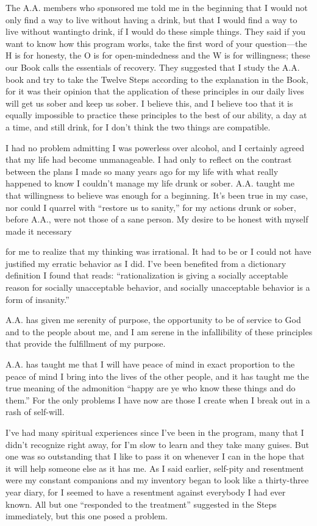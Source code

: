 \begin{biblechapter}
The A.A. members who sponsored me told me in the beginning that I would not only find a way to live without having a drink, but that I would find a way to live without wantingto drink, if I would do these simple things. They said if you want to know how this program works, take the first word of your question—the H is for honesty, the O is for open-mindedness and the W is for willingness; these our Book calls the essentials of recovery. They suggested that I study the A.A. book and try to take the Twelve Steps according to the explanation in the Book, for it was their opinion that the application of these principles in our daily lives will get us sober and keep us sober. I believe this, and I believe too that it is equally impossible to practice these principles to the best of our ability, a day at a time, and still drink, for I don’t think the two things are compatible.

I had no problem admitting I was powerless over alcohol, and I certainly agreed that my life had become unmanageable. I had only to reflect on the contrast between the plans I made so many years ago for my life with what really happened to know I couldn’t manage my life drunk or sober. A.A. taught me that willingness to believe was enough for a beginning. It’s been true in my case, nor could I quarrel with “restore us to sanity,” for my actions drunk or sober, before A.A., were not those of a sane person. My desire to be honest with myself made it necessary

for me to realize that my thinking was irrational. It had to be or I could not have justified my erratic behavior as I did. I’ve been benefited from a dictionary definition I found that reads: “rationalization is giving a socially acceptable reason for socially unacceptable behavior, and socially unacceptable behavior is a form of insanity.”

A.A. has given me serenity of purpose, the opportunity to be of service to God and to the people about me, and I am serene in the infallibility of these principles that provide the fulfillment of my purpose.

A.A. has taught me that I will have peace of mind in exact proportion to the peace of mind I bring into the lives of the other people, and it has taught me the true meaning of the admonition “happy are ye who know these things and do them.” For the only problems I have now are those I create when I break out in a rash of self-will.

I’ve had many spiritual experiences since I’ve been in the program, many that I didn’t recognize right away, for I’m slow to learn and they take many guises. But one was so outstanding that I like to pass it on whenever I can in the hope that it will help someone else as it has me. As I said earlier, self-pity and resentment were my constant companions and my inventory began to look like a thirty-three year diary, for I seemed to have a resentment against everybody I had ever known. All but one “responded to the treatment” suggested in the Steps immediately, but this one posed a problem.


\end{biblechapter}
